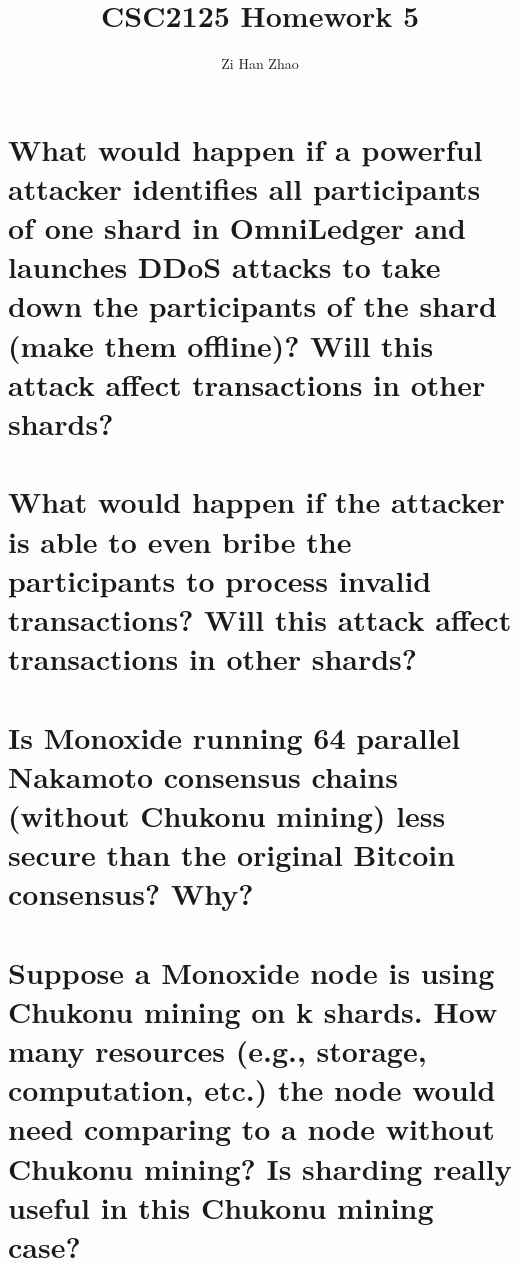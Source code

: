 \documentclass{article}
\author{Zi Han Zhao}
\affil{1001103708}
\date{}
\title{CSC2125 Homework 5}
\begin{document}
\maketitle
\renewcommand{\thesubsection}{(\alph{subsection})}
\section{What would happen if a powerful attacker identifies all participants of one shard
in OmniLedger and launches DDoS attacks to take down the participants of the
shard (make them offline)? Will this attack affect transactions in other shards?}

\section{What would happen if the attacker is able to even bribe the participants to
process invalid transactions? Will this attack affect transactions in other shards?}

\section{Is Monoxide running 64 parallel Nakamoto consensus chains (without Chukonu
mining) less secure than the original Bitcoin consensus? Why?}

\section{Suppose a Monoxide node is using Chukonu mining on k shards. How many
resources (e.g., storage, computation, etc.) the node would need comparing to a
node without Chukonu mining? Is sharding really useful in this Chukonu mining
case?}
\end{document}
